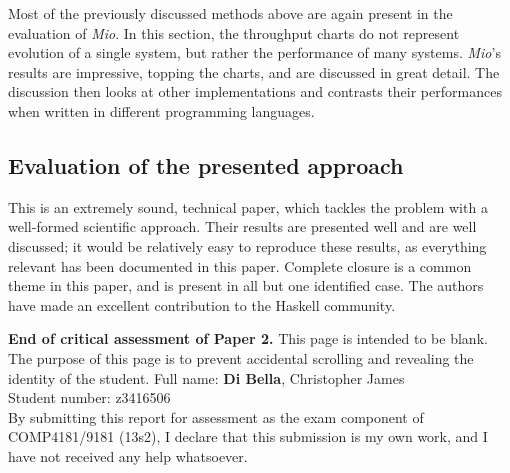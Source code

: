 \documentclass[9pt]{report}
\begin{document}
\noindent
Most of the previously discussed methods above are again present in the evaluation of {\it Mio}.
In this section, the throughput charts do not represent evolution of a single system, but rather the performance of many systems.
{\it Mio}'s results are impressive, topping the charts, and are discussed in great detail.
The discussion then looks at other implementations and contrasts their performances when written in different programming languages.

\subsection*{Evaluation of the presented approach}
This is an extremely sound, technical paper, which tackles the problem with a well-formed scientific approach.
Their results are presented well and are well discussed; it would be relatively easy to reproduce these results, as everything relevant has been documented in this paper.
Complete closure is a common theme in this paper, and is present in all but one identified case.
The authors have made an excellent contribution to the Haskell community.

\noindent
{\bf End of critical assessment of Paper 2.}
\clearpage
\noindent
This page is intended to be blank.\\

\noindent
The purpose of this page is to prevent accidental scrolling and revealing the identity of the student.
\clearpage
\noindent
Full name: \hspace{8mm} {\bf Di Bella}, Christopher James\\
Student number: z3416506\\

\noindent
By submitting this report for assessment as the exam component of COMP4181/9181 (13s2), I declare that this submission is my own work, and I have not received any help whatsoever.
\end{document}
